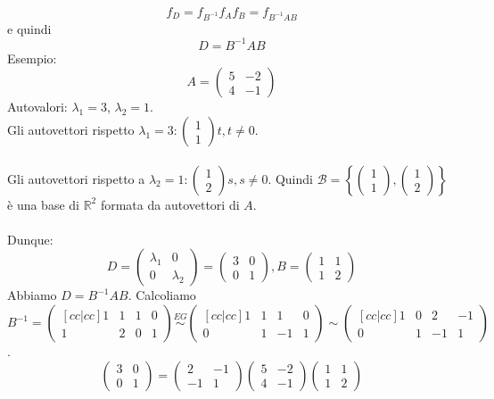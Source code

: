 \documentclass[12pt]{article}
\begin{document}
\[f_D = f_{B^{-1}}f_Af_B = f_{B^{-1}AB}\]
e quindi
\[D = B^{-1}AB\]
Esempio:
\[A = \begin{pmatrix}
    5 & -2\\
    4 & -1
\end{pmatrix}\]
Autovalori: $\lambda_1 = 3$, $\lambda_2 = 1$.\\
Gli autovettori rispetto $\lambda_1 = 3: \begin{pmatrix}
    1\\
    1
\end{pmatrix}t, t \neq 0$.\\\\
Gli autovettori rispetto a $\lambda_2 = 1: \begin{pmatrix}
    1\\
    2
\end{pmatrix}s, s \neq 0$.
Quindi $\mathcal{B} = \left\{\begin{pmatrix}
    1\\
    1
\end{pmatrix}, \begin{pmatrix}
    1\\
    2
\end{pmatrix}\right\}$ è una base di $\mathbb{R}^2$ formata da autovettori di $A$. \\\\
Dunque:
\[D = \begin{pmatrix}
    \lambda_1 & 0\\
    0 & \lambda_2
\end{pmatrix} = \begin{pmatrix}
    3 & 0\\
    0 & 1
\end{pmatrix}, B = \begin{pmatrix}
    1 & 1\\
    1 & 2
\end{pmatrix}\]
Abbiamo $D = B^{-1}AB$. Calcoliamo $B^{-1} = \begin{pmatrix}[cc|cc]
    1 & 1 & 1 & 0\\
    1 & 2 & 0 & 1
\end{pmatrix} \stackrel{EG}{\sim} \begin{pmatrix}[cc|cc]
    1 & 1 & 1 & 0\\
    0 & 1 & -1 & 1
\end{pmatrix} \sim \begin{pmatrix}[cc|cc]
    1 & 0  & 2 & -1\\
    0 & 1 & -1 & 1
\end{pmatrix}$.
\[\begin{pmatrix}
    3 & 0\\
    0 & 1
\end{pmatrix} = \begin{pmatrix}
    2 & -1\\
    -1 & 1
\end{pmatrix} \begin{pmatrix}
    5 & -2\\
    4 & -1
\end{pmatrix}\begin{pmatrix}
    1 & 1\\
    1 & 2
\end{pmatrix}\]
\end{document}
